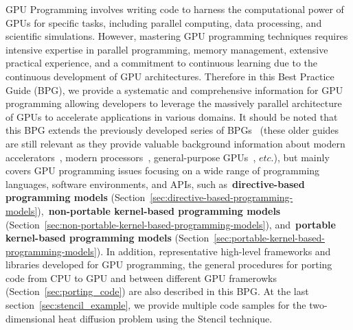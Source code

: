 \par
GPU Programming involves writing code to harness the computational power of GPUs for specific tasks, including parallel computing, data processing, and scientific simulations.
However, mastering GPU programming techniques requires intensive expertise in parallel programming, memory management, extensive practical experience, and a commitment to continuous learning due to the continuous development of GPU architectures.
Therefore in this Best Practice Guide (BPG), we provide a systematic and comprehensive information for GPU programming allowing developers to leverage the massively parallel architecture of GPUs to accelerate applications in various domains.
It should be noted that this BPG extends the previously developed series of BPGs~\cite{prace-bpg} (these older guides are still relevant as they provide valuable background information about modern accelerators~\cite{modern-accelerators}, modern processors~\cite{modern-processors}, general-purpose GPUs~\cite{gpgpu}, $etc.$), but mainly covers GPU programming issues focusing on a wide range of programming languages, software environments, and APIs, such as~\textbf{directive-based programming models} (Section~\ref{sec:directive-based-programming-models}),~\textbf{non-portable kernel-based programming models} (Section~\ref{sec:non-portable-kernel-based-programming-models}), and~\textbf{portable kernel-based programming models} (Section~\ref{sec:portable-kernel-based-programming-models}).
In addition, representative high-level frameworks and libraries developed for GPU programming, the general procedures for porting code from CPU to GPU and between different GPU framerowks (Section~\ref{sec:porting_code}) are also described in this BPG.
At the last section~\ref{sec:stencil_example}, we provide multiple code samples for the two-dimensional heat diffusion problem using the Stencil technique. 
